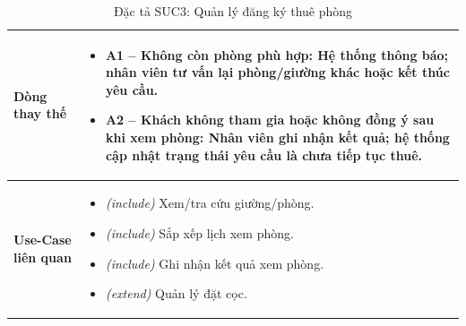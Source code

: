 \begin{table}[H]
\begin{tabularx}{\textwidth}{|>{\centering\arraybackslash\bfseries}m{3.5cm}|X|}
    \hline
    Dòng thay thế &
    \begin{itemize}[leftmargin=*, nosep, label=-]
        \vspace{0.1cm}
        \item \textbf{A1 -- Không còn phòng phù hợp:} Hệ thống thông báo; nhân viên tư vấn lại phòng/giường khác hoặc kết thúc yêu cầu.
        \item \textbf{A2 -- Khách không tham gia hoặc không đồng ý sau khi xem phòng:} Nhân viên ghi nhận kết quả; hệ thống cập nhật trạng thái yêu cầu là chưa tiếp tục thuê.
    \end{itemize} \\
    \hline
    Use-Case liên quan &
    \begin{itemize}[leftmargin=*, nosep, label=-]
        \vspace{0.1cm}
        \item \textit{(include)} Xem/tra cứu giường/phòng.
        \item \textit{(include)} Sắp xếp lịch xem phòng.
        \item \textit{(include)} Ghi nhận kết quả xem phòng.
        \item \textit{(extend)} Quản lý đặt cọc.
\end{itemize} \\
    \hline
\end{tabularx}
\caption{Đặc tả SUC3: Quản lý đăng ký thuê phòng}
\end{table}



\vspace{1cm}


